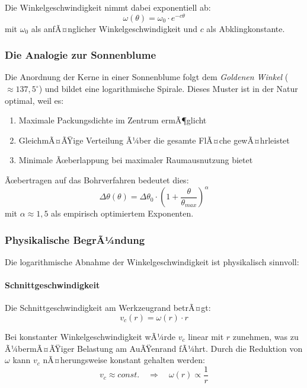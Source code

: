 ﻿\documentclass[12pt,a4paper]{article}
\begin{document}
Die Winkelgeschwindigkeit nimmt dabei exponentiell ab:
\begin{equation}
	\omega(\theta) = \omega_0 \cdot e^{-c\theta}
\end{equation}
mit $\omega_0$ als anfÃ¤nglicher Winkelgeschwindigkeit und $c$ als Abklingkonstante.

\subsubsection{Die Analogie zur Sonnenblume}

Die Anordnung der Kerne in einer Sonnenblume folgt dem \textit{Goldenen Winkel} ($\approx 137{,}5^\circ$) und bildet eine logarithmische Spirale. Dieses Muster ist in der Natur optimal, weil es:
\begin{enumerate}
	\item Maximale Packungsdichte im Zentrum ermÃ¶glicht
	\item GleichmÃ¤ÃŸige Verteilung Ã¼ber die gesamte FlÃ¤che gewÃ¤hrleistet
	\item Minimale Ãœberlappung bei maximaler Raumausnutzung bietet
\end{enumerate}

Ãœbertragen auf das Bohrverfahren bedeutet dies:
\begin{equation}
	\Delta\theta(\theta) = \Delta\theta_0 \cdot \left(1 + \frac{\theta}{\theta_{max}}\right)^{\alpha}
\end{equation}
mit $\alpha \approx 1{,}5$ als empirisch optimiertem Exponenten.

\subsubsection{Physikalische BegrÃ¼ndung}

Die logarithmische Abnahme der Winkelgeschwindigkeit ist physikalisch sinnvoll:

\paragraph{Schnittgeschwindigkeit} Die Schnittgeschwindigkeit am Werkzeugrand betrÃ¤gt:
\begin{equation}
	v_c(r) = \omega(r) \cdot r
\end{equation}

Bei konstanter Winkelgeschwindigkeit wÃ¼rde $v_c$ linear mit $r$ zunehmen, was zu Ã¼bermÃ¤ÃŸiger Belastung am AuÃŸenrand fÃ¼hrt. Durch die Reduktion von $\omega$ kann $v_c$ nÃ¤herungsweise konstant gehalten werden:
\begin{equation}
	v_c \approx const. \quad \Rightarrow \quad \omega(r) \propto \frac{1}{r}
\end{equation}
\end{document}
